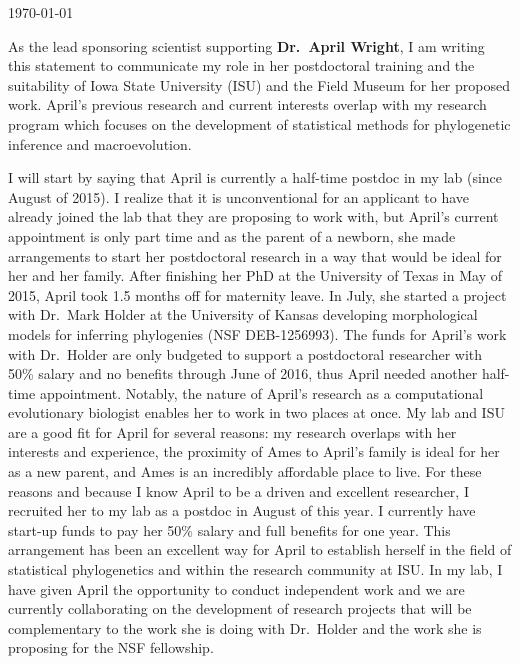 \documentclass[11pt]{article}
\begin{document}
\thispagestyle{fancy}
\begin{flushright}
\today
\end{flushright}
\vspace{2mm}




As the lead sponsoring scientist supporting \textbf{Dr.\ April Wright}, I am writing this statement to communicate my role in her postdoctoral training and the suitability of Iowa State University (ISU) and the Field Museum for her proposed work. 
April's previous research and current interests overlap with my research program which focuses on the development of statistical methods for phylogenetic inference and macroevolution. %

I will start by saying that April is currently a half-time postdoc in my lab (since August of 2015). 
I realize that it is unconventional for an applicant to have already joined the lab that they are proposing to work with, but April's current appointment is only part time and as the parent of a newborn, she made arrangements to start her postdoctoral research in a way that would be ideal for her and her family. 
After finishing her PhD at the University of Texas in May of 2015, April took 1.5 months off for maternity leave.
In July, she started a project with Dr.\ Mark Holder at the University of Kansas developing morphological models for inferring phylogenies (NSF DEB-1256993). 
The funds for April's work with Dr.\ Holder are only budgeted to support a postdoctoral researcher with 50\% salary and no benefits through June of 2016, thus April needed another half-time appointment. 
Notably, the nature of April's research as a computational evolutionary biologist enables her to work in two places at once. 
My lab and ISU are a good fit for April for several reasons: my research overlaps with her interests and experience, the proximity of Ames to April's family is ideal for her as a new parent, and Ames is an incredibly affordable place to live. 
For these reasons and because I know April to be a driven and excellent researcher, I recruited her to my lab as a postdoc in August of this year.
I currently have start-up funds to pay her 50\% salary and full benefits for one year.  
This arrangement has been an excellent way for April to establish herself in the field of statistical phylogenetics and within the research community at ISU. 
In my lab, I have given April the opportunity to conduct independent work and we are currently collaborating on the development of research projects that will be complementary to the work she is doing with Dr.\ Holder and the work she is proposing for the NSF fellowship.
\end{document}
